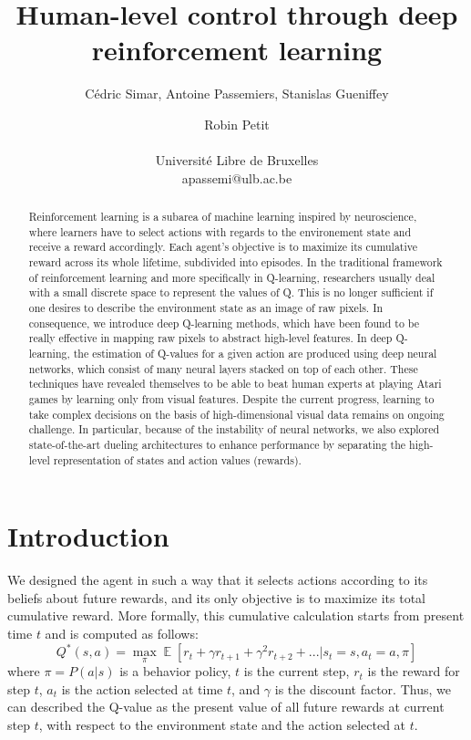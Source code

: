 \documentclass[letterpaper]{article}
\title{Human-level control through deep reinforcement learning}
\author{C\'{e}dric Simar, Antoine Passemiers, Stanislas Gueniffey \and Robin Petit \\
\mbox{}\\
Universit\'{e} Libre de Bruxelles \\
apassemi@ulb.ac.be}
\begin{document}
\maketitle

\begin{abstract}

  Reinforcement learning is a subarea of machine learning inspired by neuroscience, where learners have to select actions with
  regards to the environement state and receive a reward accordingly. Each agent's objective is to maximize its cumulative reward across its whole lifetime,
  subdivided into episodes. In the traditional framework of reinforcement learning and more specifically in Q-learning,
  researchers usually deal with a small discrete space to represent the values of Q. This is no longer sufficient if one desires to describe the environment state
  as an image of raw pixels. In consequence, we introduce deep Q-learning methods, which have been found to be really effective in mapping raw pixels
  to abstract high-level features. In deep Q-learning, the estimation of Q-values for a given action are produced using deep neural networks,
  which consist of many neural layers stacked on top of each other. 
  These techniques have revealed themselves to be able to beat human experts at playing Atari games 
  by learning only from visual features. Despite the current progress, learning to take complex decisions on the basis of high-dimensional visual data remains on
  ongoing challenge. In particular, because of the instability of neural networks, we also explored state-of-the-art dueling architectures to enhance performance
  by separating the high-level representation of states and action values (rewards).

\end{abstract}

\section{Introduction}

We designed the agent in such a way that it selects actions according to its beliefs about future rewards, and its only objective is to maximize its total
cumulative reward. More formally, this cumulative calculation starts from present time $t$ and is computed as follows:
\[
  Q^{*}(s, a) = \max_{\pi} \mathop{\mathbb{E}}[ r_t + \gamma r_{t+1} + \gamma^2 r_{t+2} + ... | s_t = s, a_t = a, \pi]
\]
where $\pi = P(a | s)$ is a behavior policy, $t$ is the current step, $r_t$ is the reward for step $t$, $a_t$ is the action selected at time $t$, 
and $\gamma$ is the discount factor. Thus, we can described the Q-value as the present value of all future rewards at current step $t$,
with respect to the environment state and the action selected at $t$.
\end{document}
